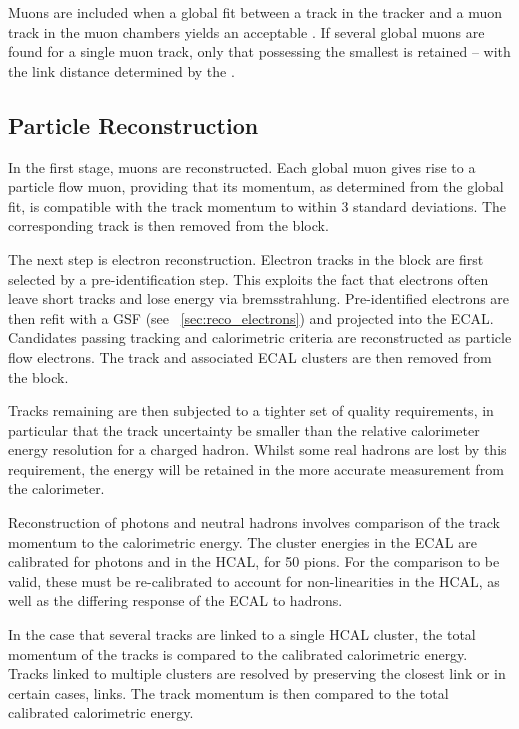 Muons are included when a global fit between a track in the tracker and a muon
track in the muon chambers yields an acceptable \chisq. If several global muons
are found for a single muon track, only that possessing the smallest \chisq is
retained -- with the link distance determined by the \chisq.

\subsection{Particle Reconstruction}
In the first stage, muons are reconstructed. Each global muon gives rise to a
particle flow muon, providing that its momentum, as determined from the global
fit, is compatible with the track momentum to within 3 standard deviations. The
corresponding track is then removed from the block.

The next step is electron reconstruction. Electron tracks in the block are first
selected by a pre-identification step. This exploits the fact that electrons
often leave short tracks and lose energy via bremsstrahlung. Pre-identified
electrons are then refit with a \ac{GSF} (see \sec~\ref{sec:reco_electrons}) and
projected into the \ac{ECAL}.  Candidates passing tracking and calorimetric
criteria are reconstructed as particle flow electrons. The track and associated
\ac{ECAL} clusters are then removed from the block.

Tracks remaining are then subjected to a tighter set of quality requirements, in
particular that the track \Pt uncertainty be smaller than the relative
calorimeter energy resolution for a charged hadron. Whilst some real hadrons are
lost by this requirement, the energy will be retained in the more accurate
measurement from the calorimeter.

Reconstruction of photons and neutral hadrons involves comparison of the track
momentum to the calorimetric energy. The cluster energies in the \ac{ECAL} are
calibrated for photons and in the \ac{HCAL}, for \unit{50}{\GeV} pions. For the
comparison to be valid, these must be re-calibrated to account for
non-linearities in the \ac{HCAL}, as well as the differing response of the
\ac{ECAL} to hadrons.

In the case that several tracks are linked to a single \ac{HCAL} cluster, the
total momentum of the tracks is compared to the calibrated calorimetric energy.
Tracks linked to multiple clusters are resolved by preserving the closest link
or in certain cases, links. The track momentum is then compared to the total
calibrated calorimetric energy.

